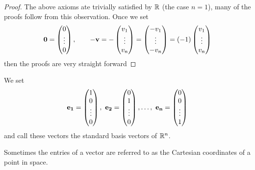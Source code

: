 \documentclass[10pt, a4paper]{article}
\begin{document}
\begin{proof}
    The above axioms ate trivially satisfied by $\mathbb{R}$ (the case $n = 1$), many of the proofs follow from this observation. Once we set
    \[
    \mathbf{0} = \begin{pmatrix}
        0 \\
        \vdots \\
        0
    \end{pmatrix},
    \qquad
    -\mathbf{v} = -\begin{pmatrix}
        v_1 \\
        \vdots \\
        v_n
    \end{pmatrix}
    =
    \begin{pmatrix}
        -v_1 \\
        \vdots \\
        -v_n
    \end{pmatrix}
    =
    (-1)\begin{pmatrix}
        v_1 \\
        \vdots \\
        v_n
    \end{pmatrix}
    \]
    then the proofs are very straight forward
\end{proof}

\begin{definition}
    We set
    \[
    \mbf{e_1} = \begin{pmatrix}
        1 \\
        0 \\
        \vdots \\
        0
    \end{pmatrix},
    \ 
    \mbf{e_2} = \begin{pmatrix}
        0 \\
        1 \\
        \vdots \\
        0
    \end{pmatrix},
    \dotsc,\ 
    \mbf{e_n} = \begin{pmatrix}
        0 \\
        0 \\
        \vdots \\
        1
    \end{pmatrix}
    \]
    and call these vectors the standard basis vectors of $\mathbb{R} ^ n$.
\end{definition}
Sometimes the entries of a vector are referred to as the Cartesian coordinates of a point in space.
\end{document}
